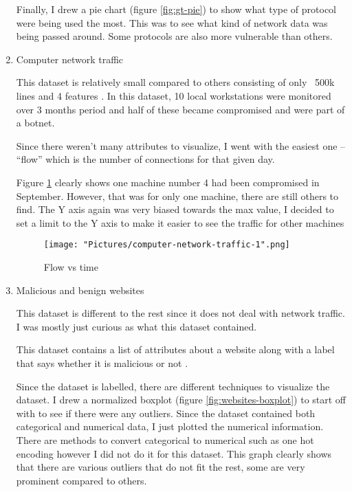 \documentclass[11pt]{article}
\begin{document}
\begin{enumerate}
  Finally, I drew a pie chart (figure \ref{fig:gt-pie}) to show what type of protocol were being used the most. This was to see what kind of network data was being passed around. Some protocols are also more vulnerable than others. 

  \item{Computer network traffic }

  This dataset is relatively small compared to others consisting of only ~500k lines and 4 features \cite{bg-dataset-net-traffic}. In this dataset, 10 local workstations were monitored over 3 months period and half of these became compromised and were part of a botnet. 

  Since there weren’t many attributes to visualize, I went with the easiest one – “flow” which is the number of connections for that given day. 

  Figure \ref{fig:com-net-flow} clearly shows one machine number 4 had been compromised in September. However, that was for only one machine, there are still others to find. The Y axis again was very biased towards the max value, I decided to set a limit to the Y axis to make it easier to see the traffic for other machines

\begin{figure}[h!]
   \texttt{[image: "Pictures/computer-network-traffic-1".png]}
   \caption{Flow vs time}
   \label{fig:com-net-flow}
\end{figure}

  \item{Malicious and benign websites}

  This dataset is different to the rest since it does not deal with network traffic. I was mostly just curious as what this dataset contained.
  
  This dataset contains a list of attributes about a website along with a label that says whether it is malicious or not \cite{bg-dataset-websites}. 

  Since the dataset is labelled, there are different techniques to visualize the dataset. I drew a normalized boxplot (figure \ref{fig:websites-boxplot}) to start off with to see if there were any outliers. Since the dataset contained both categorical and numerical data, I just plotted the numerical information. There are methods to convert categorical to numerical such as one hot encoding however I did not do it for this dataset. This graph clearly shows that there are various outliers that do not fit the rest, some are very prominent compared to others.


\end{enumerate}
\end{document}
